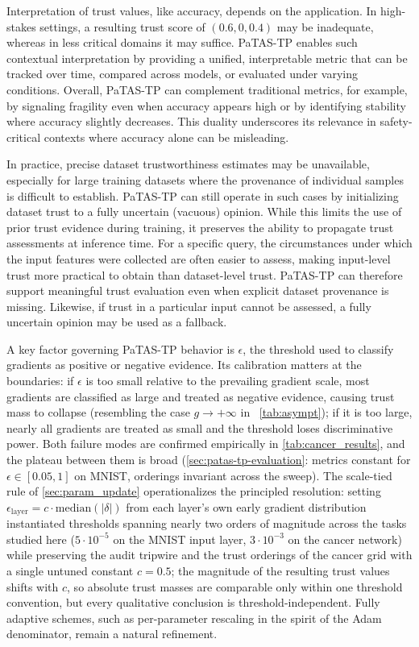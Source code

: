 Interpretation of trust values, like accuracy, depends on the application. In high-stakes settings, a resulting trust score of \((0.6, 0, 0.4)\) may be inadequate, whereas in less critical domains it may suffice. \ac{PaTAS-TP} enables such contextual interpretation by providing a unified, interpretable metric that can be tracked over time, compared across models, or evaluated under varying conditions. Overall, \ac{PaTAS-TP} can complement traditional metrics, for example, by signaling fragility even when accuracy appears high or by identifying stability where accuracy slightly decreases. This duality underscores its relevance in safety-critical contexts where accuracy alone can be misleading.

In practice, precise dataset trustworthiness estimates may be unavailable, especially for large training datasets where the provenance of individual samples is difficult to establish. \ac{PaTAS-TP} can still operate in such cases by initializing dataset trust to a fully uncertain (vacuous) opinion. While this limits the use of prior trust evidence during training, it preserves the ability to propagate trust assessments at inference time. For a specific query, the circumstances under which the input features were collected are often easier to assess, making input-level trust more practical to obtain than dataset-level trust. \ac{PaTAS-TP} can therefore support meaningful trust evaluation even when explicit dataset provenance is missing. Likewise, if trust in a particular input cannot be assessed, a fully uncertain opinion may be used as a fallback.

A key factor governing \ac{PaTAS-TP} behavior is $\epsilon$, the threshold used to classify gradients as positive or negative evidence. Its calibration matters at the boundaries: if $\epsilon$ is too small relative to the prevailing gradient scale, most gradients are classified as large and treated as negative evidence, causing trust mass to collapse (resembling the case \(g \to +\infty\) in ~\cref{tab:asympt}); if it is too large, nearly all gradients are treated as small and the threshold loses discriminative power. Both failure modes are confirmed empirically in \cref{tab:cancer_results}, and the plateau between them is broad (\cref{sec:patas-tp-evaluation}: metrics constant for $\epsilon \in [0.05, 1]$ on MNIST, orderings invariant across the sweep). The scale-tied rule of \cref{sec:param_update} operationalizes the principled resolution: setting $\epsilon_{\mathrm{layer}} = c \cdot \mathrm{median}(|\delta|)$ from each layer's own early gradient distribution instantiated thresholds spanning nearly two orders of magnitude across the tasks studied here ($5 \cdot 10^{-5}$ on the MNIST input layer, $3 \cdot 10^{-3}$ on the cancer network) while preserving the audit tripwire and the trust orderings of the cancer grid with a single untuned constant $c = 0.5$; the magnitude of the resulting trust values shifts with $c$, so absolute trust masses are comparable only within one threshold convention, but every qualitative conclusion is threshold-independent. Fully adaptive schemes, such as per-parameter rescaling in the spirit of the \ac{Adam} denominator, remain a natural refinement.


